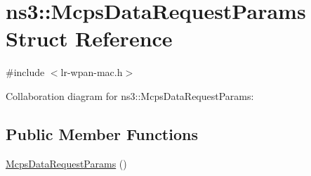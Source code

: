 \hypertarget{structns3_1_1McpsDataRequestParams}{}\section{ns3\+:\+:Mcps\+Data\+Request\+Params Struct Reference}
\label{structns3_1_1McpsDataRequestParams}


{\ttfamily \#include $<$lr-\/wpan-\/mac.\+h$>$}



Collaboration diagram for ns3\+:\+:Mcps\+Data\+Request\+Params\+:
\subsection*{Public Member Functions}
\begin{DoxyCompactItemize}
\item 
\hyperlink{structns3_1_1McpsDataRequestParams_ab80fb7a0f2f8baac9e97d9a83dcda576}{Mcps\+Data\+Request\+Params} ()
\end{DoxyCompactItemize}
